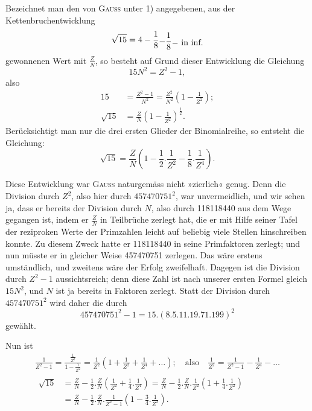Bezeichnet man den von \textsc{Gauss} unter 1) angegebenen, aus der Kettenbruchentwicklung
\[
\sqrt{15}=4-\frac{1}{8}\MDown{-.4ex}{-\frac{1}{8}}\MDown{-.8ex}{-\ \text{in inf.}}
\]
\noindent gewonnenen Wert mit $\frac{Z}{N}$, so besteht auf Grund dieser Entwicklung die
Gleichung
\[
15N^2=Z^2-1,
\]
\noindent also
\[
\begin{aligned}
15&=\frac{Z^2-1}{N^2}=\frac{Z^2}{N^2}\left(1-\frac{1}{Z^2}\right);\\
\sqrt{15}&=\frac{Z}{N}\left(1-\frac{1}{Z^2}\right)^{\frac12}.
\end{aligned}
\]
\noindent Berücksichtigt man nur die drei ersten Glieder der Binomialreihe, so entsteht die Gleichung:
\[
\sqrt{15}=\frac{Z}{N}\left(1-\frac{1}{2}\mathord{.}\frac{1}{Z^2}-\frac{1}{8}\mathord{.}\frac{1}{Z^4}\right).
\]
\par\noindent\hspace*{\parindent}Diese Entwicklung war \textsc{Gauss} naturgemäss nicht »zierlich« genug. Denn
die Division durch $Z^2$, also hier durch $457470751^2$, war unvermeidlich, und
wir sehen ja, dass er bereits der Division durch $N$, also durch 118118440
aus dem Wege gegangen ist, indem er $\frac{Z}{N}$ in Teilbrüche zerlegt hat, die er
mit Hilfe seiner Tafel der reziproken Werte der Primzahlen leicht auf beliebig viele Stellen hinschreiben konnte. Zu diesem Zweck hatte er 118118440
in seine Primfaktoren zerlegt; und nun müsste er in gleicher Weise 457470751
zerlegen. Das wäre erstens umständlich, und zweitens wäre der Erfolg zweifelhaft.
\clearpage{}
\noindent\hspace*{\parindent}Dagegen ist die Division durch $Z^2-1$ aussichtsreich; denn diese Zahl
ist nach unserer ersten Formel gleich $15N^2$, und $N$ ist ja bereits in Faktoren
zerlegt. Statt der Division durch $457470751^2$ wird daher die durch
\[
457470751^2-1=15\mathord{.}(8\mathord{.}5\mathord{.}11\mathord{.}19\mathord{.}71\mathord{.}199)^2
\]
\noindent gewählt.
\par\noindent\hspace*{\parindent}Nun ist
\[
\begin{gathered}
\frac{1}{Z^2-1}=\frac{\frac{1}{Z^2}}{1-\frac{1}{Z^2}}=\frac{1}{Z^2}\left(1+\frac{1}{Z^2}+\frac{1}{Z^4}+\ldots\right);\quad\text{also}\quad\frac{1}{Z^2}=\frac{1}{Z^2-1}-\frac{1}{Z^4}-\ldots\\[6pt]
\begin{aligned}
\sqrt{15}&=\frac{Z}{N}-\frac{1}{2}\mathord{.}\frac{Z}{N}\left(\frac{1}{Z^2}+\frac{1}{4}\mathord{.}\frac{1}{Z^4}\right)=\frac{Z}{N}-\frac{1}{2}\mathord{.}\frac{Z}{N}\mathord{.}\frac{1}{Z^2}\left(1+\frac{1}{4}\mathord{.}\frac{1}{Z^2}\right)\\
&=\frac{Z}{N}-\frac{1}{2}\mathord{.}\frac{Z}{N}\mathord{.}\frac{1}{Z^2-1}\left(1-\frac{3}{4}\mathord{.}\frac{1}{Z^2}\right).
\end{aligned}
\end{gathered}
\]
